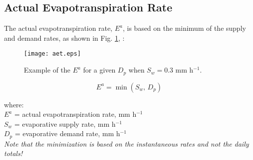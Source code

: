 \subsection{Actual Evapotranspiration Rate}
\label{sec:aet}
The actual evapotranspiration rate, $E^a$, is based on the minimum of the supply and demand rates, as shown in Fig. \ref{fig:aet}, \parencite[Eq. 7]{federer82}:

\begin{figure}[ht!]
    \texttt{[image: aet.eps]}
    \caption{Example of the $E^a$ for a given $D_p$ when $S_w = 0.3$ mm h$^{-1}$.}
    \label{fig:aet}
\end{figure}

\begin{equation}
\label{eq:aet}
	E^a = \min\left(S_w\text{, }D_p\right)
\end{equation}

\noindent where:\\
\indent $E^a$ = actual evapotranspiration rate, mm h$^{-1}$\\
\indent $S_w$ = evaporative supply rate, mm h$^{-1}$\\
\indent $D_p$ = evaporative demand rate, mm h$^{-1}$\\

\noindent \textit{Note that the minimization is based on the instantaneous rates and not the daily totals!}

